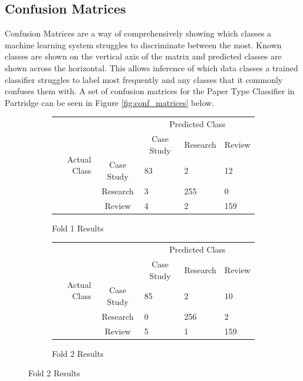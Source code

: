 \subsection{ Confusion Matrices}

Confusion Matrices are a way of comprehensively showing which classes a machine
learning system struggles to discriminate between the most. Known classes are
shown on the vertical axis of the matrix and predicted classes are shown across
the horizontal. This allows inference of which data classes a trained
classifier struggles to label most frequently and any classes that it commonly
confuses them with. A set of confusion matrices for the Paper Type Classifier
in Partridge can be seen in Figure \ref{fig:conf_matrices} below.

\begin{figure}[!h]

\centering

\begin{subfigure}[b]{\textwidth}

\caption{Fold 1 Results}
\centering
\begin{tabular}{ | r l l l l |}
\hline
\multirow{5}{*}{\begin{sideways}{Actual Class}\end{sideways}}
&&\multicolumn{3}{c|}{Predicted Class} \\
&& \multicolumn{1}{c}{Case Study} &	Research&	\multicolumn{1}{c|}{Review}\\
\cline{3-5}
& \multicolumn{1}{c|}{Case Study} &	83&		2&		12\\
&\multicolumn{1}{c|}{Research}&	3&		255&		0\\
&\multicolumn{1}{c|}{Review}&	4&		2&		159\\
\hline

\end{tabular}
\end{subfigure}


\begin{subfigure}[b]{\textwidth}

\caption{Fold 2 Results}
\centering
\begin{tabular}{ | r l l l l |}
\hline
\multirow{5}{*}{\begin{sideways}{Actual Class}\end{sideways}}
&&\multicolumn{3}{c|}{Predicted Class} \\
&& \multicolumn{1}{c}{Case Study} &	Research&	\multicolumn{1}{c|}{Review}\\
\cline{3-5}
&\multicolumn{1}{c|}{Case Study}&   85    &         2&		10\\
&\multicolumn{1}{c|}{Research}&	0   &		256&		2\\
&\multicolumn{1}{c|}{Review}&	5&		1&		159\\
\hline
\end{tabular}


\end{subfigure}
\end{figure}
